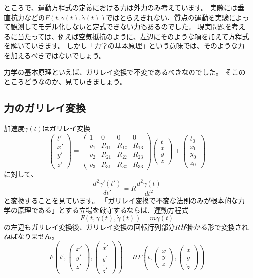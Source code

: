 ところで、運動方程式の定義における力は外力のみ考えています。
実際には垂直抗力などの$F(t,\gamma(t),\dot\gamma(t))$ではとらえきれない、質点の運動を実験によって観測してモデル化しないと定式できない力もあるのでした。
現実問題を考えるに当たっては、例えば空気抵抗のように、左辺にそのような項を加えて方程式を解いていきます。
しかし「力学の基本原理」という意味では、そのような力を加えるべきではないでしょう。

力学の基本原理といえば、ガリレイ変換で不変であるべきなのでした。
そこのところどうなのか、見ていきましょう。

\subsection{力のガリレイ変換}

加速度$\ddot\gamma(t)$はガリレイ変換
\[
  \begin{pmatrix}
    t'\\x'\\y'\\z'
  \end{pmatrix}
  =
  \begin{pmatrix}
    1 & 0 & 0 & 0 \\
    v_1 & R_{11} & R_{12} & R_{13} \\
    v_2 & R_{21} & R_{22} & R_{23} \\
    v_3 & R_{31} & R_{32} & R_{33}
  \end{pmatrix}
  \begin{pmatrix}
    t\\x\\y\\z
  \end{pmatrix}
  +
  \begin{pmatrix}
    t_0\\x_0\\y_0\\z_0
  \end{pmatrix}
\]
に対して、
\[
  \frac{d^2\gamma'(t')}{dt'}=R\frac{d^2\gamma(t)}{dt^2}
\]
と変換することを見ています。
「ガリレイ変換で不変な法則のみが根本的な力学の原理である」とする立場を厳守するならば、運動方程式
\[
  F(t,\gamma(t),\dot\gamma(t))=m\ddot\gamma(t)
\]
の左辺もガリレイ変換後、ガリレイ変換の回転行列部分$R$が掛かる形で変換されねばなりません。
\[
  F\left(t',\begin{pmatrix}x'\\y'\\z'\end{pmatrix},\begin{pmatrix}\dot{x'}\\\dot{y'}\\\dot{z'}\end{pmatrix}\right)=RF\left(t,\begin{pmatrix}x\\y\\z\end{pmatrix},\begin{pmatrix}\dot{x}\\\dot{y}\\\dot{z}\end{pmatrix}\right)
\]

